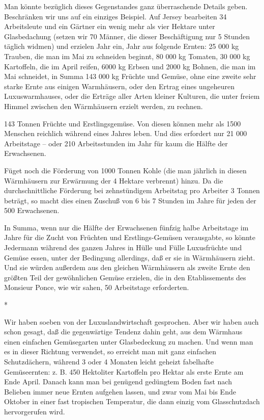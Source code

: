 \documentclass{scrbook}
\begin{document}
Man könnte bezüglich dieses Gegenstandes ganz überraschende Details geben. Beschränken wir uns auf ein einziges Beispiel. Auf Jersey bearbeiten 34 Arbeitsleute und ein Gärtner ein wenig mehr als vier Hektare unter Glasbedachung (setzen wir 70 Männer, die dieser Beschäftigung nur 5 Stunden täglich widmen) und erzielen Jahr ein, Jahr aus folgende Ernten: 25 000 kg Trauben, die man im Mai zu schneiden beginnt, 80 000 kg Tomaten, 30 000 kg Kartoffeln, die im April reifen, 6000 kg Erbsen und 2000 kg Bohnen, die man im Mai schneidet, in Summa 143 000 kg Früchte und Gemüse, ohne eine zweite sehr starke Ernte aus einigen Warmhäusern, oder den Ertrag eines ungeheuren Luxuswarmhauses, oder die Erträge aller Arten kleiner Kulturen, die unter freiem Himmel zwischen den Wärmhäusern erzielt werden, zu rechnen.

143 Tonnen Früchte und Erstlingsgemüse. Von diesen können mehr als 1500 Menschen reichlich während eines Jahres leben. Und dies erfordert nur 21 000 Arbeitstage – oder 210 Arbeitsstunden im Jahr für kaum die Hälfte der Erwachsenen.

Füget noch die Förderung von 1000 Tonnen Kohle (die man jährlich in diesen Wärmhäusern zur Erwärmung der 4 Hektare verbrennt) hinzu. Da die durchschnittliche Förderung bei zehnstündigem Arbeitstag pro Arbeiter 3 Tonnen beträgt, so macht dies einen Zuschuß von 6 bis 7 Stunden im Jahre für jeden der 500 Erwachsenen.

In Summa, wenn nur die Hälfte der Erwachsenen fünfzig halbe Arbeitstage im Jahre für die Zucht von Früchten und Erstlings-Gemüsen verausgabte, so könnte Jedermann während des ganzen Jahres in Hülle und Fülle Luxusfrüchte und Gemüse essen, unter der Bedingung allerdings, daß er sie in Wärmhäusern zieht. Und sie würden außerdem aus den gleichen Wärmhäusern als zweite Ernte den größten Teil der gewöhnlichen Gemüse erzielen, die in den Etablissements des Monsieur Ponce, wie wir sahen, 50 Arbeitstage erforderten.

\begin{center}*\end{center}

Wir haben soeben von der Luxuslandwirtschaft gesprochen. Aber wir haben auch schon gesagt, daß die gegenwärtige Tendenz dahin geht, aus dem Wärmhaus einen einfachen Gemüsegarten unter Glasbedeckung zu machen. Und wenn man es in dieser Richtung verwendet, so erreicht man mit ganz einfachen Schutzdächern, während 3 oder 4 Monaten leicht geheizt fabelhafte Gemüseernten: z. B. 450 Hektoliter Kartoffeln pro Hektar als erste Ernte am Ende April. Danach kann man bei genügend gedüngtem Boden fast nach Belieben immer neue Ernten aufgehen lassen, und zwar vom Mai bis Ende Oktober in einer fast tropischen Temperatur, die dann einzig vom Glasschutzdach hervorgerufen wird.
\end{document}
